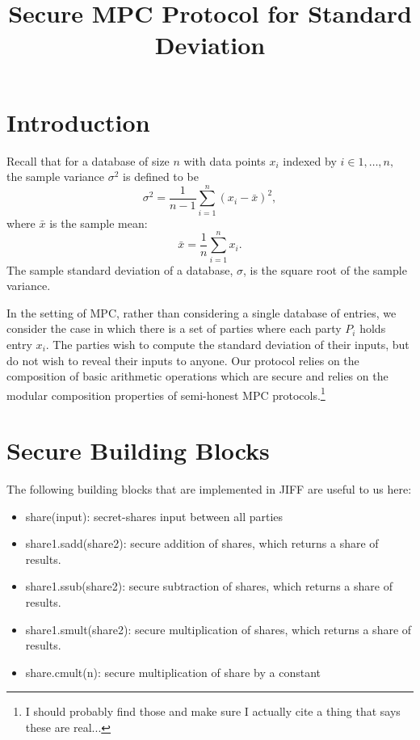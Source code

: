 \documentclass[11pt, oneside]{article}   	%
\title{Secure MPC Protocol for Standard Deviation}
\begin{document}
\maketitle

\section{Introduction}
Recall that for a database of size $n$ with data points $x_i$ indexed by $i \in {1, \dots, n},$ the sample variance $\sigma^2$ is defined to be
$$\sigma^2 = \frac{1}{n-1} \sum_{i=1}^n (x_i - \bar{x})^2, $$
where $\bar{x}$ is the sample mean:
$$ \bar{x} = \frac{1}{n} \sum_{i=1}^n x_i.$$ 
The sample standard deviation of a database, $\sigma$, is the square root of the sample variance.

In the setting of MPC, rather than considering a single database of entries, we consider the case in which there is a set of parties where each party $P_i$ holds entry $x_i$. The parties wish to compute the standard deviation of their inputs, but do not wish to reveal their inputs to anyone. Our protocol relies on the composition of basic arithmetic operations which are secure and relies on the modular composition properties of semi-honest MPC protocols.\footnote{I should probably find those and make sure I actually cite a thing that says these are real...} 

\section{Secure Building Blocks}
The following building blocks that are implemented in JIFF are useful to us here:

\begin{itemize}
\item share(input): secret-shares input between all parties
\item share1.sadd(share2): secure addition of shares, which returns a share of results.
\item share1.ssub(share2): secure subtraction of shares, which returns a share of results.
\item share1.smult(share2): secure multiplication of shares, which returns a share of results. 
\item share.cmult(n): secure multiplication of share by a constant
\end{itemize}
\end{document}

